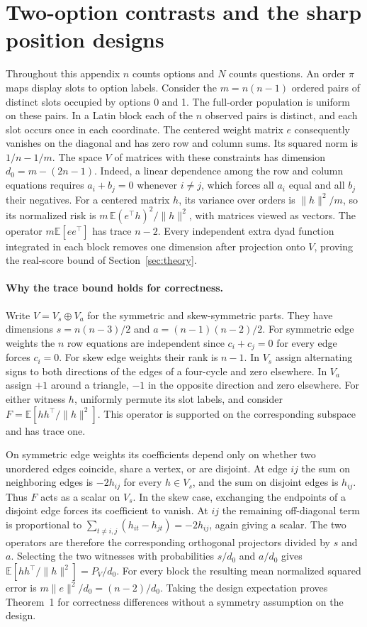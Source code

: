 \section{Two-option contrasts and the sharp position designs}
\label{app:general-position}
Throughout this appendix $n$ counts options and $N$ counts questions.
An order $\pi$ maps display slots to option labels. Consider the
$m=n(n-1)$ ordered pairs of distinct slots occupied by options 0 and 1.
The full-order population is uniform on these pairs. In a Latin block
each of the $n$ observed pairs is distinct, and each slot occurs once in
each coordinate. The centered weight matrix $e$ consequently vanishes
on the diagonal and has zero row and column sums. Its squared norm is
$1/n-1/m$. The space $V$ of matrices with these constraints has
dimension $d_0=m-(2n-1)$. Indeed, a linear dependence among the row and
column equations requires $a_i+b_j=0$ whenever $i\ne j$, which forces
all $a_i$ equal and all $b_j$ their negatives. For a centered matrix
$h$, its variance over orders is $\|h\|^2/m$, so its normalized risk
is $m\,\mathbb E(e^\top h)^2/\|h\|^2$, with matrices viewed as vectors.
The operator $m\mathbb E[ee^\top]$ has trace $n-2$. Every independent
extra dyad function integrated in each block removes one dimension
after projection onto $V$, proving the real-score bound of
Section~\ref{sec:theory}.

\paragraph{Why the trace bound holds for correctness.}
Write $V=V_s\oplus V_a$ for the symmetric and skew-symmetric parts.
They have dimensions $s=n(n-3)/2$ and $a=(n-1)(n-2)/2$. For symmetric
edge weights the $n$ row equations are independent since $c_i+c_j=0$
for every edge forces $c_i=0$. For skew edge weights their rank is $n-1$.
In $V_s$ assign alternating signs to both directions of the edges of a
four-cycle and zero elsewhere. In $V_a$ assign $+1$ around a triangle,
$-1$ in the opposite direction and zero elsewhere. For either witness
$h$, uniformly permute its slot labels, and consider
$F=\mathbb E[hh^\top/\|h\|^2]$. This operator is supported on the
corresponding subspace and has trace one.

On symmetric edge weights its coefficients depend only on whether two
unordered edges coincide, share a vertex, or are disjoint. At edge
$ij$ the sum on neighboring edges is $-2h_{ij}$ for every $h\in V_s$,
and the sum on disjoint edges is $h_{ij}$. Thus $F$ acts as a scalar
on $V_s$. In the skew case, exchanging the endpoints of a disjoint
edge forces its coefficient to vanish. At $ij$ the remaining
off-diagonal term is proportional to
$\sum_{t\ne i,j}(h_{it}-h_{jt})=-2h_{ij}$, again giving a scalar.
The two operators are therefore the corresponding orthogonal
projectors divided by $s$ and $a$. Selecting the two witnesses with
probabilities $s/d_0$ and $a/d_0$ gives $\mathbb E[hh^\top/\|h\|^2]
=P_V/d_0$. For every block the resulting mean normalized squared
error is $m\|e\|^2/d_0=(n-2)/d_0$. Taking the design expectation
proves Theorem~1 for correctness differences without a symmetry
assumption on the design.

